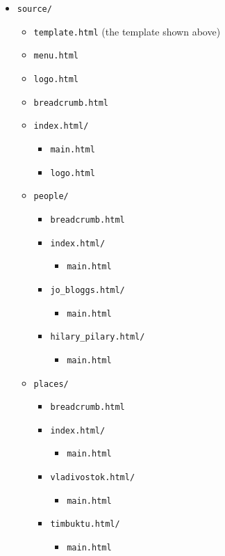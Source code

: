 \documentclass[english]{scrartcl}
\begin{document}
\begin{itemize}
\item \verb|source/|
  \begin{itemize}
  \item \verb|template.html| (the template shown above)
  \item \verb|menu.html|
  \item \verb|logo.html|
  \item \verb|breadcrumb.html|
  \item \verb|index.html/|
    \begin{itemize}
    \item \verb|main.html|
    \item \verb|logo.html|
    \end{itemize}
  \item \verb|people/|
    \begin{itemize}
    \item \verb|breadcrumb.html|
    \item \verb|index.html/|
      \begin{itemize}
      \item \verb|main.html|
      \end{itemize}
    \item \verb|jo_bloggs.html/|
      \begin{itemize}
      \item \verb|main.html|
      \end{itemize}
    \item \verb|hilary_pilary.html/|
      \begin{itemize}
      \item \verb|main.html|
      \end{itemize}
    \end{itemize}
  \item \verb|places/|
    \begin{itemize}
    \item \verb|breadcrumb.html|
    \item \verb|index.html/|
      \begin{itemize}
      \item \verb|main.html|
      \end{itemize}
    \item \verb|vladivostok.html/|
      \begin{itemize}
      \item \verb|main.html|
      \end{itemize}
    \item \verb|timbuktu.html/|
      \begin{itemize}
      \item \verb|main.html|
      \end{itemize}
    \end{itemize}
  \end{itemize}
\end{itemize}
\end{document}
